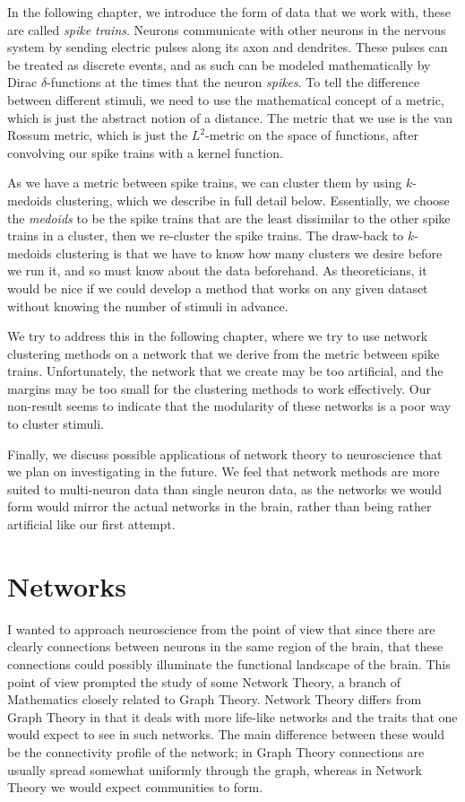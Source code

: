 \documentclass[a4paper,12pt]{report}
\begin{document}
In the following chapter, we introduce the form of data that we work with, 
these are called {\sl spike trains}.  Neurons communicate with other neurons in 
the nervous system by sending electric pulses along its axon and dendrites.  
These pulses can be treated as discrete events, and as such can be modeled 
mathematically by Dirac $\delta$-functions at the times that the neuron 
{\sl spikes}.  To tell the difference between different stimuli, we need to use 
the mathematical concept of a metric, which is just the abstract notion of a 
distance.  The metric that we use is the van Rossum metric, which is just the 
$L^2$-metric on the space of functions, after convolving our spike trains with 
a kernel function.

As we have a metric between spike trains, we can cluster them by using 
$k$-medoids clustering, which we describe in full detail below.  Essentially, 
we choose the {\sl medoids} to be the spike trains that are the least 
dissimilar to the other spike trains in a cluster, then we re-cluster the 
spike trains.  The draw-back to $k$-medoids clustering is that we have to know 
how many clusters we desire before we run it, and so must know about the data 
beforehand.  As theoreticians, it would be nice if we could develop a method 
that works on any given dataset without knowing the number of stimuli in 
advance.

We try to address this in the following chapter, where we try to use network 
clustering methods on a network that we derive from the metric between spike 
trains.  Unfortunately, the network that we create may be too artificial, and 
the margins may be too small for the clustering methods to work effectively.  
Our non-result seems to indicate that the modularity of these networks is a 
poor way to cluster stimuli.

Finally, we discuss possible applications of network theory to neuroscience 
that we plan on investigating in the future.  We feel that network methods are 
more suited to multi-neuron data than single neuron data, as the networks we 
would form would mirror the actual networks in the brain, rather than being 
rather artificial like our first attempt.





\chapter{Networks}

I wanted to approach neuroscience from the point of view that since there are
clearly connections between neurons in the same region of the brain,
that these connections could possibly illuminate the functional landscape of the
 brain.  This point of view prompted the study of some Network Theory, a branch 
of Mathematics closely related to Graph Theory. Network Theory differs from 
Graph Theory in that it deals with more life-like networks 
and the traits that one would expect to see in such networks.  
The main difference between these would be the connectivity profile of the 
network; in Graph Theory connections are usually spread somewhat uniformly 
through the graph, whereas in Network Theory we would expect communities to 
form.
\end{document}
